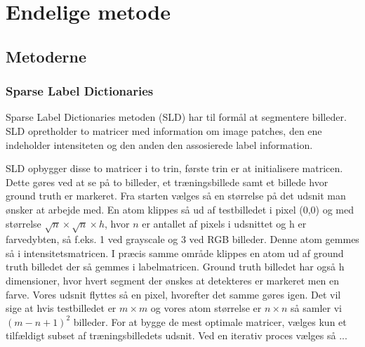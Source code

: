 \section{Endelige metode}
\subsection{Metoderne}
\subsubsection{Sparse Label Dictionaries}	%



Sparse Label Dictionaries metoden (SLD) har til formål at segmentere billeder. SLD opretholder to matricer med information om image patches, den ene indeholder intensiteten og den anden den assosierede label information.

SLD opbygger disse to matricer i to trin, første trin er at initialisere matricen. Dette gøres ved at se på to billeder, et træningsbillede samt et billede hvor ground truth er markeret. Fra starten vælges så en størrelse på det udsnit man ønsker at arbejde med. En atom klippes så ud af testbilledet i pixel (0,0) og med størrelse $\sqrt{n}\times\sqrt{n}\times h$, hvor $n$ er antallet af pixels i udsnittet og h er farvedybten, så f.eks. 1 ved grayscale og 3 ved RGB billeder. Denne atom gemmes så i intensitetsmatricen. I præcis samme område klippes en atom ud af ground truth billedet der så gemmes i labelmatricen. Ground truth billedet har også h dimensioner, hvor hvert segment der ønskes at detekteres er markeret men en farve. Vores udsnit flyttes så en pixel, hvorefter det samme gøres igen. Det vil sige at hvis testbilledet er $m\times m$ og vores atom størrelse er $n\times n$ så samler vi $(m-n+1)^2$ billeder. For at bygge de mest optimale matricer, vælges kun et tilfældigt subset af træningsbilledets udsnit. Ved en iterativ proces vælges så ...




